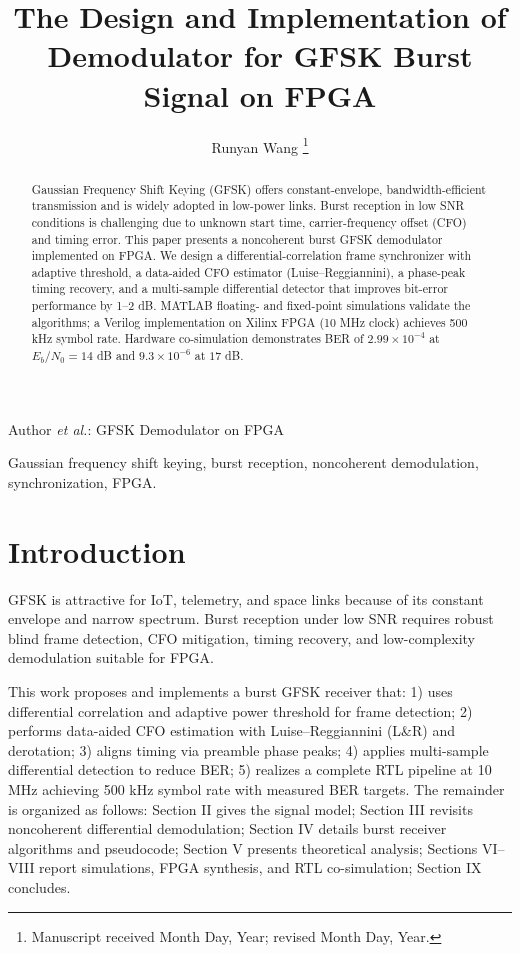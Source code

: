 \documentclass[journal]{IEEEtran}
\begin{document}
\title{The Design and Implementation of Demodulator for GFSK Burst Signal on FPGA}
\author{Runyan Wang
\thanks{Manuscript received Month Day, Year; revised Month Day, Year.}}
%
{Author \MakeLowercase{\textit{et al.}}: GFSK Demodulator on FPGA}

\maketitle

\begin{abstract}
Gaussian Frequency Shift Keying (GFSK) offers constant-envelope, bandwidth-efficient transmission and is widely adopted in low-power links. Burst reception in low SNR conditions is challenging due to unknown start time, carrier-frequency offset (CFO) and timing error. This paper presents a noncoherent burst GFSK demodulator implemented on FPGA. We design a differential-correlation frame synchronizer with adaptive threshold, a data-aided CFO estimator (Luise--Reggiannini), a phase-peak timing recovery, and a multi-sample differential detector that improves bit-error performance by 1--2 dB. MATLAB floating- and fixed-point simulations validate the algorithms; a Verilog implementation on Xilinx FPGA (10 MHz clock) achieves 500 kHz symbol rate. Hardware co-simulation demonstrates BER of $2.99\times10^{-4}$ at $E_b/N_0=14$ dB and $9.3\times10^{-6}$ at $17$ dB.
\end{abstract}

\begin{IEEEkeywords}
Gaussian frequency shift keying, burst reception, noncoherent demodulation, synchronization, FPGA.
\end{IEEEkeywords}

\section{Introduction}
GFSK is attractive for IoT, telemetry, and space links because of its constant envelope and narrow spectrum. Burst reception under low SNR requires robust blind frame detection, CFO mitigation, timing recovery, and low-complexity demodulation suitable for FPGA.

This work proposes and implements a burst GFSK receiver that: 1) uses differential correlation and adaptive power threshold for frame detection; 2) performs data-aided CFO estimation with Luise--Reggiannini (L\&R) and derotation; 3) aligns timing via preamble phase peaks; 4) applies multi-sample differential detection to reduce BER; 5) realizes a complete RTL pipeline at 10 MHz achieving 500 kHz symbol rate with measured BER targets. The remainder is organized as follows: Section II gives the signal model; Section III revisits noncoherent differential demodulation; Section IV details burst receiver algorithms and pseudocode; Section V presents theoretical analysis; Sections VI--VIII report simulations, FPGA synthesis, and RTL co-simulation; Section IX concludes.
\end{document}
